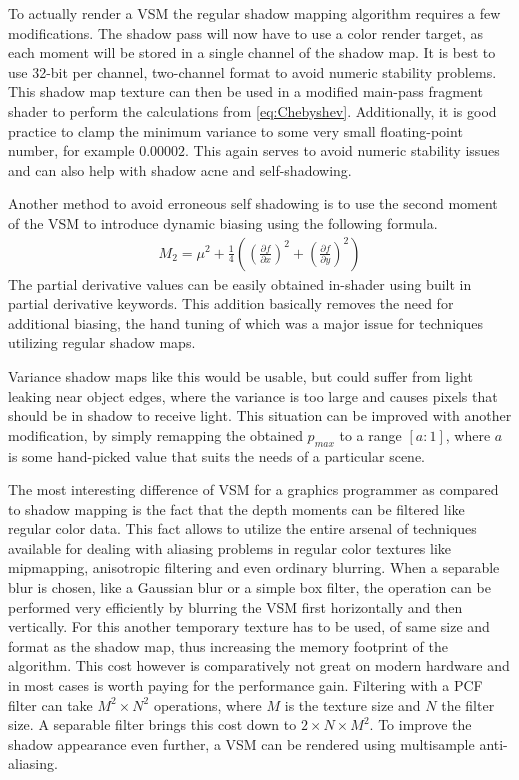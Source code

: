 To actually render a VSM the regular shadow mapping algorithm requires a few modifications. The shadow pass will now have to use a color render target, as each moment will be stored in a single channel of the shadow map. It is best to use 32-bit per channel, two-channel format to avoid numeric stability problems. This shadow map texture can then be used in a modified main-pass fragment shader to perform the calculations from \ref{eq:Chebyshev}. Additionally, it is good practice to clamp the minimum variance to some very small floating-point number, for example \(0.00002\). This again serves to avoid numeric stability issues and can also help with shadow acne and self-shadowing.

Another method to avoid erroneous self shadowing is to use the second moment of the VSM to introduce dynamic biasing using the following formula.
\begin{align}
    M_2 = \mu^2 + \frac{1}{4}\left(\left(\frac{\partial f}{\partial x}\right)^2+\left(\frac{\partial f}{\partial y}\right)^2\right)
\end{align}
The partial derivative values can be easily obtained in-shader using built in partial derivative keywords. This addition basically removes the need for additional biasing, the hand tuning of which was a major issue for techniques utilizing regular shadow maps.

Variance shadow maps like this would be usable, but could suffer from light leaking near object edges, where the variance is too large and causes pixels that should be in shadow to receive light. This situation can be improved with another modification, by simply remapping the obtained \(p_{max}\) to a range \([a:1]\), where \(a\) is some hand-picked value that suits the needs of a particular scene.

The most interesting difference of VSM for a graphics programmer as compared to shadow mapping is the fact that the depth moments can be filtered like regular color data. This fact allows to utilize the entire arsenal of techniques available for dealing with aliasing problems in regular color textures like mipmapping, anisotropic filtering and even ordinary blurring. When a separable blur is chosen, like a Gaussian blur or a simple box filter, the operation can be performed very efficiently by blurring the VSM first horizontally and then vertically. For this another temporary texture has to be used, of same size and format as the shadow map, thus increasing the memory footprint of the algorithm. This cost however is comparatively not great on modern hardware and in most cases is worth paying for the performance gain. Filtering with a PCF filter can take \(M^2\times N^2\) operations, where \(M\) is the texture size and \(N\) the filter size. A separable filter brings this cost down to \(2\times N \times M^2\). To improve the shadow appearance even further, a VSM can be rendered using multisample anti-aliasing.

